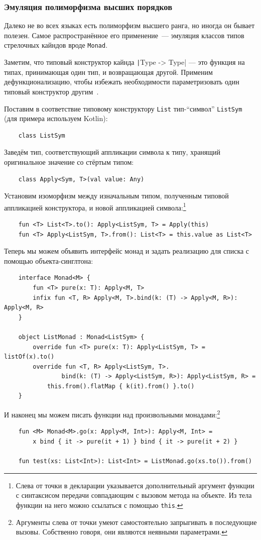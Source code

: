 \subsubsection{Эмуляция полиморфизма высших порядков} \label{subsubsec:simulating-hkt}

Далеко не во всех языках есть полиморфизм высшего ранга, но иногда он бывает полезен.
Самое распространённое его применение~--- эмуляция классов типов стрелочных кайндов вроде \texttt{Monad}.

Заметим, что типовый конструктор кайнда \texttt|Type -> Type| --- это функция на типах, принимающая один тип, и возвращающая другой.
Применим дефункционализацию, чтобы избежать необходимости параметризовать один типовый конструктор другим~\cite{defunctionalization-slides, yallop2014lightweight}.

Поставим в соответствие типовому конструктору \texttt{List} тип-``символ'' \texttt{ListSym} (для примера используем Kotlin):
\begin{verbatim}
    class ListSym
\end{verbatim}
Заведём тип, соответствующий аппликации символа к типу, хранящий оригинальное значение со стёртым типом:
\begin{verbatim}
    class Apply<Sym, T>(val value: Any)
\end{verbatim}
Установим изоморфизм между изначальным типом, полученным типовой аппликацией конструктора, и новой аппликацией символа:\footnote{Слева от точки в декларации указывается дополнительный аргумент функции с синтаксисом передачи совпадающим с вызовом метода на объекте. Из тела функции на него можно ссылаться с помощью \texttt{this}.}
\begin{verbatim}
    fun <T> List<T>.to(): Apply<ListSym, T> = Apply(this)
    fun <T> Apply<ListSym, T>.from(): List<T> = this.value as List<T>
\end{verbatim}

Теперь мы можем объявить интерфейс монад и задать реализацию для списка с помощью объекта-синглтона:
\begin{verbatim}
    interface Monad<M> {
        fun <T> pure(x: T): Apply<M, T>
        infix fun <T, R> Apply<M, T>.bind(k: (T) -> Apply<M, R>): Apply<M, R>
    }

    object ListMonad : Monad<ListSym> {
        override fun <T> pure(x: T): Apply<ListSym, T> = listOf(x).to()
        override fun <T, R> Apply<ListSym, T>.
                bind(k: (T) -> Apply<ListSym, R>): Apply<ListSym, R> =
            this.from().flatMap { k(it).from() }.to()
    }
\end{verbatim}
И наконец мы можем писать функции над произвольными монадами:\footnote{Аргументы слева от точки умеют самостоятельно запрыгивать в последующие вызовы. Собственно говоря, они являются неявными параметрами.}
\begin{verbatim}
    fun <M> Monad<M>.go(x: Apply<M, Int>): Apply<M, Int> =
        x bind { it -> pure(it + 1) } bind { it -> pure(it + 2) }

    fun test(xs: List<Int>): List<Int> = ListMonad.go(xs.to()).from()
\end{verbatim}

